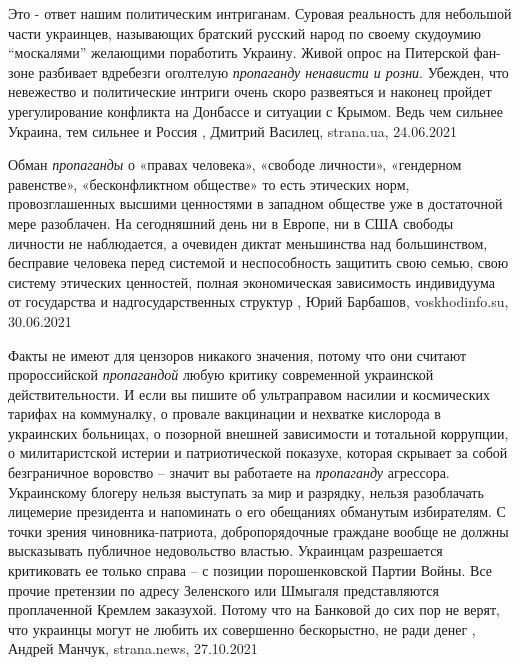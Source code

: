 Это - ответ нашим политическим интриганам.  Суровая реальность для небольшой
части украинцев, называющих братский русский народ по своему скудоумию
\enquote{москалями} желающими поработить Украину.  Живой опрос на Питерской фан-зоне
разбивает вдребезги оголтелую \emph{пропаганду ненависти и розни}.  Убежден, что
невежество и политические интриги очень скоро развеяться и наконец пройдет
урегулирование конфликта на Донбассе и ситуации с Крымом.  Ведь чем сильнее
Украина, тем сильнее и Россия
, Дмитрий Василец, strana.ua, 24.06.2021

Обман \emph{пропаганды} о «правах человека», «свободе личности», «гендерном
равенстве», «бесконфликтном обществе» то есть этических норм, провозглашенных
высшими ценностями в западном обществе уже в достаточной мере разоблачен. На
сегодняшний день ни в Европе, ни в США свободы личности не наблюдается, а
очевиден диктат меньшинства над большинством, бесправие человека перед системой
и неспособность защитить свою семью, свою систему этических ценностей, полная
экономическая зависимость индивидуума от государства и надгосударственных
структур
, 
Юрий Барбашов, voskhodinfo.su, 30.06.2021

Факты не имеют для цензоров никакого значения, потому что они считают
пророссийской \emph{пропагандой} любую критику современной украинской
действительности. И если вы пишите об ультраправом насилии и космических
тарифах на коммуналку, о провале вакцинации и нехватке кислорода в украинских
больницах, о позорной внешней зависимости и тотальной коррупции, о
милитаристской истерии и патриотической показухе, которая скрывает за собой
безграничное воровство – значит вы работаете на \emph{пропаганду} агрессора.
Украинскому блогеру нельзя выступать за мир и разрядку, нельзя разоблачать
лицемерие президента и напоминать о его обещаниях обманутым избирателям. С
точки зрения чиновника-патриота, добропорядочные граждане вообще не должны
высказывать публичное недовольство властью. Украинцам разрешается критиковать
ее только справа – с позиции порошенковской Партии Войны. Все прочие претензии
по адресу Зеленского или Шмыгаля представляются проплаченной Кремлем заказухой.
Потому что на Банковой до сих пор не верят, что украинцы могут не любить их
совершенно бескорыстно, не ради денег
, 
Андрей Манчук, strana.news, 27.10.2021

